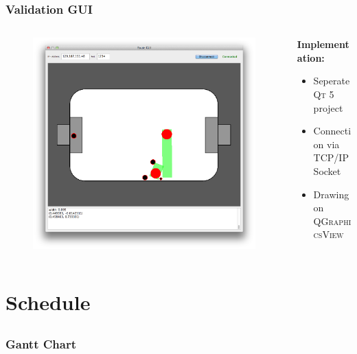\documentclass[hyperref={pdfpagelabels=false}]{beamer}
\begin{document}
\begin{frame}
    \frametitle{Validation GUI}
    \begin{columns}[T]
        \begin{column}{0.4\textwidth}
            \begin{figure}
                \center
                \includegraphics[width=\textwidth]{Pictures/gui-1}
            \end{figure}
        \end{column}
        \begin{column}{0.6\textwidth}
            \textbf{Implementation:}
            \begin{itemize}
                \item Seperate \textsc{Qt 5} project
                \item Connection via TCP/IP Socket
                \item Drawing on \textsc{QGraphicsView}
            \end{itemize}
        \end{column}
    \end{columns}
\end{frame}

\section{Schedule}
\subsection{}
\begin{frame}
    \frametitle{Gantt Chart}
\end{frame}
\end{document}
